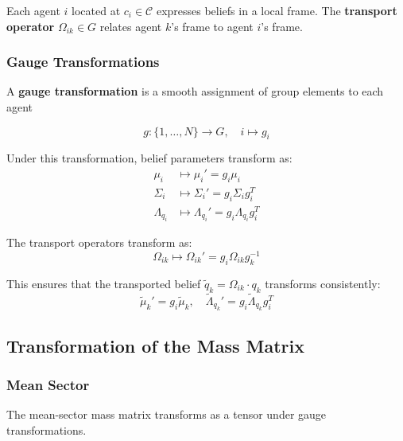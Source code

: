 \documentclass[12pt]{article}
\begin{document}
Each agent $i$ located at $c_i \in \mathcal{C}$ expresses beliefs in a local frame. The \textbf{transport operator} $\Omega_{ik} \in G$ relates agent $k$'s frame to agent $i$'s frame.

\subsubsection{Gauge Transformations}

A \textbf{gauge transformation} is a smooth assignment of group elements to each agent

\begin{equation}
g: \{1, \ldots, N\} \to G, \quad i \mapsto g_i
\end{equation}

Under this transformation, belief parameters transform as:
\begin{align}
\mu_i &\mapsto \mu_i' = g_i \mu_i \\
\Sigma_i &\mapsto \Sigma_i' = g_i \Sigma_i g_i^T \\
\Lambda_{q_i} &\mapsto \Lambda_{q_i}' = g_i \Lambda_{q_i} g_i^T
\end{align}

The transport operators transform as:
\begin{equation}
\Omega_{ik} \mapsto \Omega_{ik}' = g_i \Omega_{ik} g_k^{-1}
\end{equation}

This ensures that the transported belief $\tilde{q}_k = \Omega_{ik}\cdot q_k$ transforms consistently:
\begin{equation}
\tilde{\mu}_k' = g_i \tilde{\mu}_k, \quad \tilde{\Lambda}_{q_k}' = g_i \tilde{\Lambda}_{q_k} g_i^T
\end{equation}

\subsection{Transformation of the Mass Matrix}

\subsubsection{Mean Sector}

The mean-sector mass matrix transforms as a tensor under gauge transformations.
\end{document}
